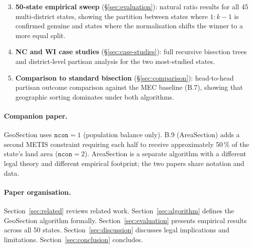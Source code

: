 \begin{enumerate}\setcounter{enumi}{2}
\item \textbf{50-state empirical sweep} (\S\ref{sec:evaluation}): natural ratio
  results for all 45 multi-district states, showing the partition between
  states where $1:k-1$ is confirmed genuine and states where the
  normalisation shifts the winner to a more equal split.

\item \textbf{NC and WI case studies} (\S\ref{sec:case-studies}): full
  recursive bisection trees and district-level partisan analysis for the two
  most-studied states.

\item \textbf{Comparison to standard bisection} (\S\ref{sec:comparison}):
  head-to-head partisan outcome comparison against the MEC baseline (B.7),
  showing that geographic sorting dominates under both algorithms.
\end{enumerate}

\paragraph{Companion paper.}
GeoSection uses $\mathtt{ncon}=1$ (population balance only).
B.9 (AreaSection) adds a second METIS constraint requiring each half to
receive approximately 50\,\% of the state's land area ($\mathtt{ncon}=2$).
AreaSection is a separate algorithm with a different legal theory and
different empirical footprint; the two papers share notation and data.

\paragraph{Paper organisation.}
Section~\ref{sec:related} reviews related work.
Section~\ref{sec:algorithm} defines the GeoSection algorithm formally.
Section~\ref{sec:evaluation} presents empirical results across all 50 states.
Section~\ref{sec:discussion} discusses legal implications and limitations.
Section~\ref{sec:conclusion} concludes.
